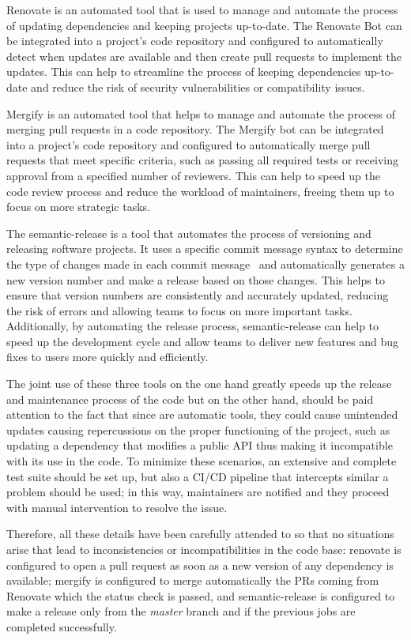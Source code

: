Renovate is an automated tool that is used to manage and automate the process of updating
dependencies and keeping projects up-to-date. The Renovate Bot can be integrated into a project's code repository and configured to automatically
detect when updates are available and then create pull requests to implement the updates. This can help to streamline the process of keeping
dependencies up-to-date and reduce the risk of security vulnerabilities or compatibility issues.

Mergify is an automated tool that helps to manage and automate the process of merging pull requests in a code repository. The Mergify bot
can be integrated into a project's code repository and configured to automatically merge pull requests that meet specific criteria, such as passing
all required tests or receiving approval from a specified number of reviewers. This can help to speed up the code review process and reduce the
workload of maintainers, freeing them up to focus on more strategic tasks.

The semantic-release is a tool that automates the process of versioning and releasing software projects. It uses a specific commit message syntax to
determine the type of changes made in each commit message~\cite{conventional-commits} and automatically generates a new version number and make a
release based on those changes.
This helps to ensure that version numbers are consistently and accurately updated, reducing the risk of errors and allowing teams to
focus on more important tasks. Additionally, by automating the release process, semantic-release can help to speed up the development cycle and allow
teams to deliver new features and bug fixes to users more quickly and efficiently.

The joint use of these three tools on the one hand greatly speeds up the release and maintenance process of the code but on the other hand, should be
paid attention to the fact that since are automatic tools, they could cause unintended updates causing repercussions on the proper functioning of the
project, such as updating a dependency that modifies a public API thus making it incompatible with its use in the code. To minimize these scenarios,
an extensive and complete test suite should be set up, but also a CI/CD pipeline that intercepts similar a problem should be used; in this
way, maintainers are notified and they proceed with manual intervention to resolve the issue.

Therefore, all these details have been carefully attended to so that no situations arise that lead to inconsistencies or
incompatibilities in the code base: renovate is configured to open a pull request as soon as a new version of any dependency is available; mergify is
configured to merge automatically the PRs coming from Renovate which the status check is passed, and semantic-release is configured to make a
release only from the \emph{master} branch and if the previous jobs are completed successfully.

